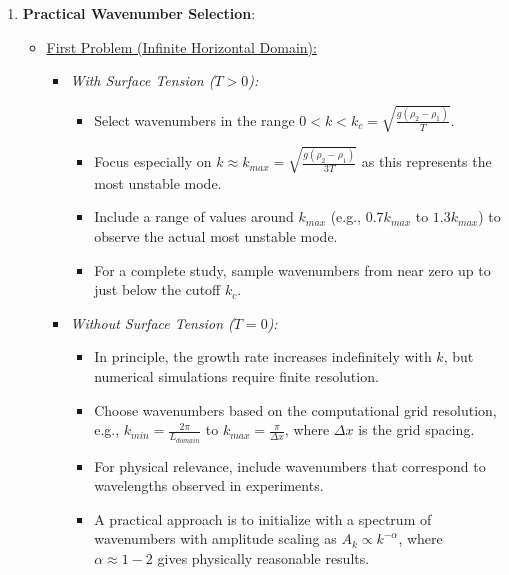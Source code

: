 \documentclass[12pt,a4paper]{article}
\begin{document}
\begin{enumerate}
    \item \textbf{Practical Wavenumber Selection}:
    \begin{itemize}
        \item \underline{First Problem (Infinite Horizontal Domain):}
            \begin{itemize}
                \item \textit{With Surface Tension ($T > 0$):} 
                \begin{itemize}
                    \item Select wavenumbers in the range $0 < k < k_c = \sqrt{\frac{g(\rho_2-\rho_1)}{T}}$.
                    \item Focus especially on $k \approx k_{max} = \sqrt{\frac{g(\rho_2-\rho_1)}{3T}}$ as this represents the most unstable mode.
                    \item Include a range of values around $k_{max}$ (e.g., $0.7k_{max}$ to $1.3k_{max}$) to observe the actual most unstable mode.
                    \item For a complete study, sample wavenumbers from near zero up to just below the cutoff $k_c$.
                \end{itemize}
                \item \textit{Without Surface Tension ($T = 0$):}
                \begin{itemize}
                    \item In principle, the growth rate increases indefinitely with $k$, but numerical simulations require finite resolution.
                    \item Choose wavenumbers based on the computational grid resolution, e.g., $k_{min} = \frac{2\pi}{L_{domain}}$ to $k_{max} = \frac{\pi}{\Delta x}$, where $\Delta x$ is the grid spacing.
                    \item For physical relevance, include wavenumbers that correspond to wavelengths observed in experiments.
                    \item A practical approach is to initialize with a spectrum of wavenumbers with amplitude scaling as $A_k \propto k^{-\alpha}$, where $\alpha \approx 1-2$ gives physically reasonable results.
                \end{itemize}
            \end{itemize}
            

\end{itemize}
\end{enumerate}
\end{document}
